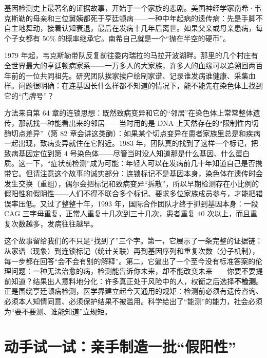 \begin{zhengju}
基因检测史上最著名的证据故事，开始于一个家族的悲剧。美国神经学家南希·韦克斯勒的母亲和三位舅姨都死于亨廷顿病——一种中年起病的遗传病：先是手脚不自主地舞动，接着认知衰退，最后在发病十几年后离世。如果父亲或母亲患病，每个子女都有 50\% 的概率继承它。南希自己就是一个“抛在半空的硬币”。

1979 年起，韦克斯勒带队反复前往委内瑞拉的马拉开波湖畔。那里的几个村庄有全世界最大的亨廷顿病家系——一万多人的大家族，许多人的血缘可以追溯回两百年前的一位共同祖先。研究团队挨家挨户绘制家谱、记录谁发病谁健康、采集血样。问题很明确：在连基因长什么样都不知道的情况下，能不能先在染色体上找到它的“门牌号”？

方法来自第 64 章的连锁思想：既然致病变异和它的“邻居”在染色体上常常整体遗传，那就找一种能看出来的邻居——当时用的是 DNA 上天然存在的“限制性内切酶切点差异”（第 82 章会讲这类酶）：如果某个切点变异在患者家族里总是和疾病一起出现，致病变异就住在它附近。1983 年，团队真的找到了这样一个标记，把致病基因定位到第 4 号染色体——尽管当时没人知道那是什么基因、什么蛋白质。这一下，“症状前检测”成为可能：年轻人可以在发病前几十年知道自己是否携带它。但请注意这个故事的诚实部分：连锁标记不是基因本身，染色体在遗传时会发生交换（重组），偶尔会把标记和致病变异“拆散”，所以早期检测存在小比例的假阳性和假阴性——人们不得不联合多个标记、要求多位家族成员参与，才能把错误率压低。又过了整整十年，1993 年，国际合作团队才终于抓到基因本身：一段 CAG 三字母重复，正常人重复十几次到三十几次，患者重复 40 次以上，而且重复次数越多，发病往往越早。

这个故事留给我们的不只是“找到了”三个字。第一，它展示了一条完整的证据链：从家谱（现象）到连锁标记（统计关联）再到基因序列和重复次数（分子机制），每一步都在回答“会不会有别的解释”。第二，它逼出了一个至今没有标准答案的伦理问题：一种无法治愈的病，检测能告诉你未来，却不能改变未来——你要不要提前知道？结果出人意料地分化：许多真正处于风险中的人，权衡之后选择\textbf{不检测}。正是围绕亨廷顿病检测，医学界建立起今天通用的规矩：检测前必须有遗传咨询、必须本人知情同意、必须保护结果不被滥用。科学给出了“能测”的能力，社会必须为“要不要测、谁能知道”立规矩。
\end{zhengju}

\section{动手试一试：亲手制造一批“假阳性”}

